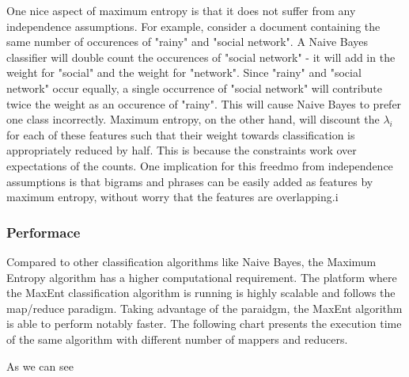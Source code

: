 One nice aspect of maximum entropy is that it does not suffer from any independence assumptions. For example, consider a document containing the same number of occurences of
"rainy" and "social network". A Naive Bayes classifier will double count the occurences of "social network" - it will add in the weight for "social" and the weight for "network". Since "rainy" and
"social network" occur equally, a single occurrence of "social network" will contribute twice the weight as an occurence of "rainy". This will cause Naive Bayes to prefer one class incorrectly.
Maximum entropy, on the other hand, will discount the $\lambda_i$ for each of these features such that their weight towards classification is appropriately reduced by half.
This is because the constraints work over expectations of the counts. One implication for this freedmo from independence assumptions is that bigrams and phrases can be easily added as features 
by maximum entropy, without worry that the features are overlapping.i


\subsubsection{Performace}
Compared to other classification algorithms like Naive Bayes, the Maximum Entropy algorithm has a higher computational requirement. 
The platform where the MaxEnt classification algorithm is running is highly scalable and follows the map/reduce paradigm. Taking advantage of the paraidgm, the MaxEnt algorithm
is able to perform notably faster.
The following chart presents the execution time of the same algorithm with different number of mappers and reducers.





As we can see


